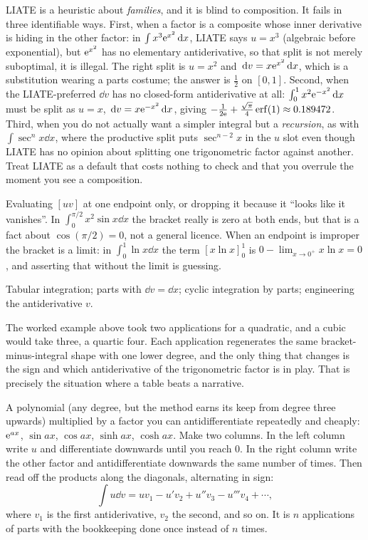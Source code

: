 \begin{keynote}
LIATE is a heuristic about \emph{families}, and it is blind to composition. It fails in three identifiable ways. First, when a factor is a composite whose inner derivative is hiding in the other factor: in $\int x^{3}\mathrm{e}^{x^{2}}\,\mathrm{d} x$, LIATE says $u=x^{3}$ (algebraic before exponential), but $\mathrm{e}^{x^{2}}$ has no elementary antiderivative, so that split is not merely suboptimal, it is illegal. The right split is $u=x^{2}$ and $\,\mathrm{d} v=x\mathrm{e}^{x^{2}}\,\mathrm{d} x$, which is a substitution wearing a parts costume; the answer is $\tfrac12$ on $[0,1]$. Second, when the LIATE-preferred $\dd v$ has no closed-form antiderivative at all: $\int_0^1x^{2}\mathrm{e}^{-x^{2}}\,\mathrm{d} x$ must be split as $u=x$, $\,\mathrm{d} v=x\mathrm{e}^{-x^{2}}\,\mathrm{d} x$, giving $-\tfrac{1}{2\mathrm{e}}+\tfrac{\sqrt{\pi}}{4}\operatorname{erf}(1)\approx0.189472$. Third, when you do not actually want a simpler integral but a \emph{recursion}, as with $\int\sec^{n}x\dd x$, where the productive split puts $\sec^{n-2}x$ in the $u$ slot even though LIATE has no opinion about splitting one trigonometric factor against another. Treat LIATE as a default that costs nothing to check and that you overrule the moment you see a composition.
\end{keynote}

\begin{trap}
Evaluating $[uv]$ at one endpoint only, or dropping it because it ``looks like it vanishes''. In $\int_0^{\pi/2}x^{2}\sin x\dd x$ the bracket really is zero at both ends, but that is a fact about $\cos(\pi/2)=0$, not a general licence. When an endpoint is improper the bracket is a limit: in $\int_0^1\ln x\dd x$ the term $[x\ln x]_0^1$ is $0-\lim_{x\to0^+}x\ln x=0$, and asserting that without the limit is guessing.
\end{trap}

\begin{seealsob}Tabular integration; parts with $\dd v=\dd x$; cyclic integration by parts; engineering the antiderivative $v$.\end{seealsob}

The worked example above took two applications for a quadratic, and a cubic would take three, a quartic four. Each application regenerates the same bracket-minus-integral shape with one lower degree, and the only thing that changes is the sign and which antiderivative of the trigonometric factor is in play. That is precisely the situation where a table beats a narrative.

\cue A polynomial (any degree, but the method earns its keep from degree three upwards) multiplied by a factor you can antidifferentiate repeatedly and cheaply: $\mathrm{e}^{ax}$, $\sin ax$, $\cos ax$, $\sinh ax$, $\cosh ax$.
\method Make two columns. In the left column write $u$ and differentiate downwards until you reach $0$. In the right column write the other factor and antidifferentiate downwards the same number of times. Then read off the products along the diagonals, alternating in sign:
\[\int u\dd v=uv_1-u'v_2+u''v_3-u'''v_4+\cdots,\]
where $v_1$ is the first antiderivative, $v_2$ the second, and so on. It is $n$ applications of parts with the bookkeeping done once instead of $n$ times.

